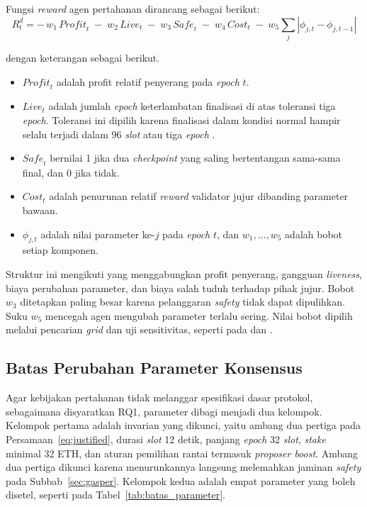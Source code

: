 Fungsi \textit{reward} agen pertahanan dirancang sebagai berikut:
\begin{equation}
R^{d}_t = -\,w_1\,\textit{Profit}_t \;-\; w_2\,\textit{Live}_t \;-\; w_3\,\textit{Safe}_t \;-\; w_4\,\textit{Cost}_t \;-\; w_5 \sum_{j} \left|\phi_{j,t} - \phi_{j,t-1}\right|
\label{eq:reward_pertahanan}
\end{equation}

\noindent dengan keterangan sebagai berikut.
\begin{itemize}
	\item $\textit{Profit}_t$ adalah profit relatif penyerang pada \textit{epoch} $t$.
	\item $\textit{Live}_t$ adalah jumlah \textit{epoch} keterlambatan finalisasi di atas toleransi tiga \textit{epoch}. Toleransi ini dipilih karena finalisasi dalam kondisi normal hampir selalu terjadi dalam 96 \textit{slot} atau tiga \textit{epoch} \parencite{laneve2025stochastic}.
	\item $\textit{Safe}_t$ bernilai 1 jika dua \textit{checkpoint} yang saling bertentangan sama-sama final, dan 0 jika tidak.
	\item $\textit{Cost}_t$ adalah penurunan relatif \textit{reward} validator jujur dibanding parameter bawaan.
	\item $\phi_{j,t}$ adalah nilai parameter ke-$j$ pada \textit{epoch} $t$, dan $w_1, \dots, w_5$ adalah bobot setiap komponen.
\end{itemize}

Struktur ini mengikuti \textcite{skowronski2026adaptive} yang menggabungkan profit penyerang, gangguan \textit{liveness}, biaya perubahan parameter, dan biaya salah tuduh terhadap pihak jujur. Bobot $w_3$ ditetapkan paling besar karena pelanggaran \textit{safety} tidak dapat dipulihkan. Suku $w_5$ mencegah agen mengubah parameter terlalu sering. Nilai bobot dipilih melalui pencarian \textit{grid} dan uji sensitivitas, seperti pada \textcite{skowronski2026adaptive} dan \textcite{wushishi2026coadam}.

\subsection{Batas Perubahan Parameter Konsensus}
\label{subsec:batas_parameter}
Agar kebijakan pertahanan tidak melanggar spesifikasi dasar protokol, sebagaimana disyaratkan RQ1, parameter dibagi menjadi dua kelompok. Kelompok pertama adalah invarian yang dikunci, yaitu ambang dua pertiga pada Persamaan~\eqref{eq:justified}, durasi \textit{slot} 12 detik, panjang \textit{epoch} 32 \textit{slot}, \textit{stake} minimal 32 ETH, dan aturan pemilihan rantai termasuk \textit{proposer boost}. Ambang dua pertiga dikunci karena menurunkannya langsung melemahkan jaminan \textit{safety} pada Subbab~\ref{sec:gasper}. Kelompok kedua adalah empat parameter yang boleh disetel, seperti pada Tabel~\ref{tab:batas_parameter}.

